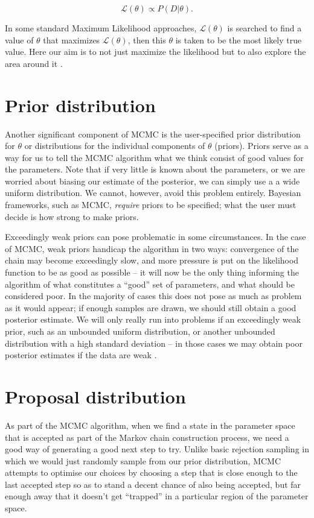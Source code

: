     \begin{equation}
    	\mathcal{L}(\theta) \propto P(D|\theta).
    \end{equation}

    In some standard Maximum Likelihood approaches, $\mathcal{L}(\theta)$ is searched to find a value of $\theta$ that maximizes $\mathcal{L}(\theta)$, then this $\theta$ is taken to be the most likely true value. Here our aim is to not just maximize the likelihood but to also explore the area around it \cite{Andrieu2003}.


\section{Prior distribution}

    Another significant component of MCMC is the user-specified prior distribution for $\theta$ or distributions for the individual components of $\theta$ (priors). Priors serve as a way for us to tell the MCMC algorithm what we think consist of good values for the parameters. Note that if very little is known about the parameters, or we are worried about biasing our estimate of the posterior, we can simply use a a wide uniform distribution. We cannot, however, avoid this problem entirely. Bayesian frameworks, such as MCMC, \textit{require} priors to be specified; what the user must decide is how strong to make priors.

   	Exceedingly weak priors can pose problematic in some circumstances. In the case of MCMC, weak priors handicap the algorithm in two ways: convergence of the chain may become exceedingly slow, and more pressure is put on the likelihood function to be as good as possible -- it will now be the only thing informing the algorithm of what constitutes a ``good'' set of parameters, and what should be considered poor. In the majority of cases this does not pose as much as problem as it would appear; if enough samples are drawn, we should still obtain a good posterior estimate. We will only really run into problems if an exceedingly weak prior, such as an unbounded uniform distribution, or another unbounded distribution with a high standard deviation -- in those cases we may obtain poor posterior estimates if the data are weak \cite{Andrieu2003}.

\section{Proposal distribution}

    As part of the MCMC algorithm, when we find a state in the parameter space that is accepted as part of the Markov chain construction process, we need a good way of generating a good next step to try. Unlike basic rejection sampling in which we would just randomly sample from our prior distribution, MCMC attempts to optimise our choices by choosing a step that is close enough to the last accepted step so as to stand a decent chance of also being accepted, but far enough away that it doesn't get ``trapped'' in a particular region of the parameter space.

